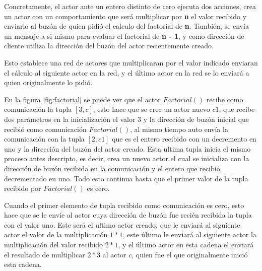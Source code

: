 Concretamente, el actor ante un entero distinto de cero ejecuta dos acciones, crea un actor con
un comportamiento que será multiplicar por \textbf{n} el valor recibido y
enviarlo al buzón de quien pidió el calculo del factorial de \textbf{n}.
También, se envía un mensaje a si mismo para evaluar el factorial de \textbf{n - 1}, y como dirección de cliente utiliza la dirección del buzón del actor
recientemente creado. 

Esto establece una red de actores que multiplicaran por  el valor indicado enviaran el cálculo al siguiente actor en la red, y el último actor 
en la red se lo enviará a quien originalmente lo pidió. 

En la figura \ref{fig:factorial} se puede ver que el actor $Factorial()$ recibe como comunicación la tupla $[3,c]$, esto hace que se cree un actor nuevo $c1$, que recibe dos parámetros en la inicialización el valor $3$ y la dirección de buzón inicial que recibió como comunicación $Factorial()$, al mismo tiempo auto envía la comunicación con la tupla $[2,c1]$ que es el entero recibido con un decremento en uno y la dirección del buzón del actor creado. Esta ultima tupla inicia el mismo proceso antes descripto, es decir, crea un nuevo actor el cual se inicializa con la dirección de buzón recibida en la comunicación y el entero que recibió decrementado en uno. Todo esto continua hasta que el primer valor de la tupla recibido por $Factorial()$ es cero. 

Cuando el primer elemento de tupla recibido como comunicación es cero, esto hace que se le envíe al actor cuya dirección de buzón fue recién recibida la tupla con el valor uno. Este será el ultimo actor creado, que le enviará al siguiente actor el valor de la multiplicación $1*1$, este último le enviará al siguiente actor la multiplicación del valor recibido $2*1$, y el último actor en esta cadena el enviará el resultado de multiplicar $2*3$ al actor $c$, quien fue el que originalmente inició esta cadena.

